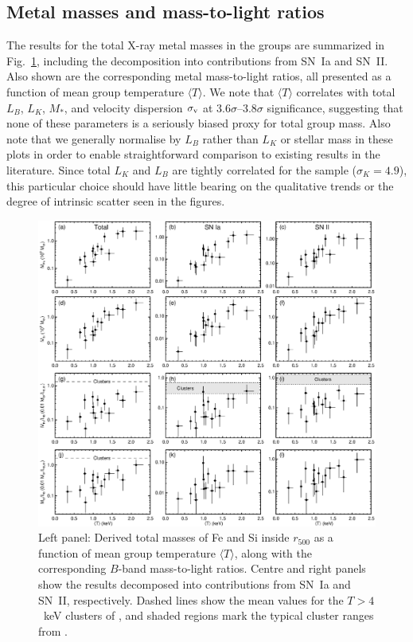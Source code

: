 \documentclass[useAMS,usenatbib]{mn2e}
\begin{document}
\subsection{Metal masses and mass-to-light ratios}

The results for the total X-ray metal masses in the groups are
summarized in Fig.~\ref{fig,all}, including the decomposition into
contributions from SN~Ia and SN~II. Also shown are the corresponding
metal mass-to-light ratios, all presented as a function of mean group
temperature $\langle T\rangle$.  We note that $\langle T \rangle$
correlates with total $L_B$, $L_K$, $M_\ast$, and velocity dispersion
$\sigma_{\rm v}$ at 3.6$\sigma$--3.8$\sigma$ significance, suggesting
that none of these parameters is a seriously biased proxy for total
group mass. Also note that we generally normalise by $L_B$ rather than
$L_K$ or stellar mass in these plots in order to enable
straightforward comparison to existing results in the
literature. Since total $L_K$ and $L_B$ are tightly correlated for the
sample ($\sigma_K = 4.9$), this particular choice should have little
bearing on the qualitative trends or the degree of intrinsic scatter
seen in the figures.

\begin{figure} 
\hspace{0mm} 
\includegraphics[width=178mm]{fig8.eps}
\caption{Left panel: Derived total masses of Fe and Si inside
  $r_{500}$ as a function of mean group temperature $\langle T
  \rangle$, along with the corresponding $B$-band mass-to-light
  ratios. Centre and right panels show the results decomposed into
  contributions from SN~Ia and SN~II, respectively. Dashed lines show
  the mean values for the $T>4$~keV clusters of \citet{fino03}, and
  shaded regions mark the typical cluster ranges from \citet{fino00}.}
\label{fig,all} 
\end{figure} 
\end{document}
